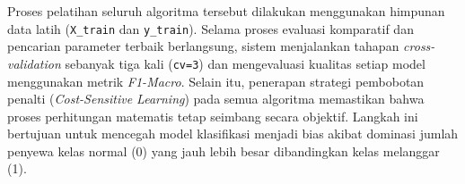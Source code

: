 Proses pelatihan seluruh algoritma tersebut dilakukan menggunakan himpunan data latih (\texttt{X\_train} dan \texttt{y\_train}). Selama proses evaluasi komparatif dan pencarian parameter terbaik berlangsung, sistem menjalankan tahapan \textit{cross-validation} sebanyak tiga kali (\texttt{cv=3}) dan mengevaluasi kualitas setiap model menggunakan metrik \textit{F1-Macro}. Selain itu, penerapan strategi pembobotan penalti (\textit{Cost-Sensitive Learning}) pada semua algoritma memastikan bahwa proses perhitungan matematis tetap seimbang secara objektif. Langkah ini bertujuan untuk mencegah model klasifikasi menjadi bias akibat dominasi jumlah penyewa kelas normal (0) yang jauh lebih besar dibandingkan kelas melanggar (1).